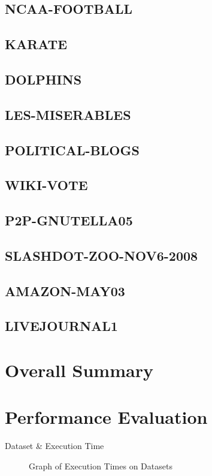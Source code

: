 \documentclass{report}
\begin{document}
\subsection{NCAA-FOOTBALL}
\subsection{KARATE}
\subsection{DOLPHINS}
\subsection{LES-MISERABLES}
\subsection{POLITICAL-BLOGS}
\subsection{WIKI-VOTE}
\subsection{P2P-GNUTELLA05}
\subsection{SLASHDOT-ZOO-NOV6-2008}
\subsection{AMAZON-MAY03}
\subsection{LIVEJOURNAL1}

\section{Overall Summary}

\section{Performance Evaluation}
\begin{table}
  \centering
  \begin{tabular}{}
    \toprule
    Dataset & Execution Time\\
    \midrule
    \bottomrule
  \end{tabular}
  \caption{Execution Times on Datasets}
  \label{execution-times-table}
\end{table}
\begin{figure}
  \centering
  
  \caption{Graph of Execution Times on Datasets}
  \label{execution-times-graph}
\end{figure}
\appendix
\end{document}
